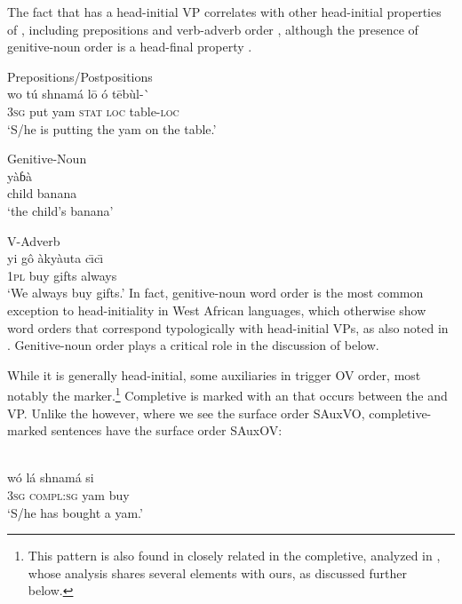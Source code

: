 \documentclass[output=paper,newtxmath,modfonts,nonflat,draftmode]{langsci/langscibook}
\begin{document}
The fact that  has a head-initial VP correlates with other head-initial properties of , including prepositions  and verb-adverb order , although the presence of genitive-noun order is a head-final property . 

\ea
\ea  \label{ex:12a:gwari} {Prepositions/Postpositions}\\
\gll wo tú shnamá l\=o ó t\=ebùl-\`{} \\
3\textsc{sg} put yam \textsc{stat} \textsc{loc} table-\textsc{loc} \\
\glt `S/he is putting the yam on the table.'

\ex \label{ex:12b:gwari} {Genitive-Noun}\\
 {yàɓà}\\
child banana \\
\glt `the child's banana' \hfill \citep[][25]{hyman1970}

\ex \label{ex:12c:gwari} {V-Adverb}\\
\gll yi gô àkyàuta {c\=\i c\=\i} \\
1\textsc{pl} buy gifts always \\
\glt `We always buy gifts.' \hfill \citep[][51]{hyman1970}
\z
\z
In fact, genitive-noun word order is the most common exception to head-initiality in West African languages, which otherwise show word orders that correspond typologically with head-initial VPs, as also noted in \citet{heine76}. Genitive-noun order plays a critical role in the discussion of  below.

While it is generally head-initial, some auxiliaries in  trigger OV order, most notably the  marker.\footnote{This pattern is also found in closely related  in the completive, analyzed in \citet{kandy03}, whose analysis shares several elements with ours, as discussed further below.} Completive  is marked with an  that occurs between the  and VP. Unlike the  however, where we see the surface order SAuxVO, completive-marked sentences have the surface order SAuxOV:

\ea \label{ex:13:gwari}
	\\
\gll wó lá shnamá si \\
3\textsc{sg} \textsc{compl:sg} yam buy \\
\glt `S/he has bought a yam.' \hfill \citep[][64]{hyman1970}
\end{document}
